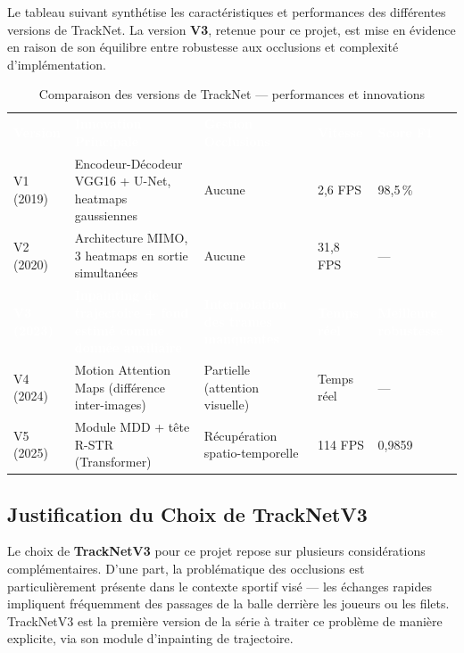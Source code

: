 \begin{itemize}
Le tableau suivant synthétise les caractéristiques et performances des différentes
versions de TrackNet. La version \textbf{V3}, retenue pour ce projet, est mise en
évidence en raison de son équilibre entre robustesse aux occlusions et complexité
d'implémentation.

\begin{table}[H]
  \centering
  \renewcommand{\arraystretch}{1.3}
  \begin{tabularx}{\textwidth}{C{2cm} X C{3cm} C{2cm} C{2cm}}
    \textcolor{white}{\textbf{Version}} &
    \textcolor{white}{\textbf{Innovation Principale}} &
    \textcolor{white}{\textbf{Gestion Occlusions}} &
    \textcolor{white}{\textbf{Vitesse}} &
    \textcolor{white}{\textbf{Score F1}} \\
    V1 (2019) &
    Encodeur-Décodeur VGG16 + U-Net, heatmaps gaussiennes &
    Aucune &
    2,6 FPS &
    98,5\,\% \\
    V2 (2020) &
    Architecture MIMO, 3 heatmaps en sortie simultanées &
    Aucune &
    31,8 FPS &
    — \\
    \textcolor{white}{\textbf{V3 (2023)}} &
    \textcolor{white}{\textbf{Inpainting de trajectoire + fond estimé comme donnée auxiliaire}} &
    \textcolor{white}{\textbf{Interpolation des trames manquantes}} &
    \textcolor{white}{\textbf{Temps réel}} &
    \textcolor{white}{\textbf{Meilleure robustesse}} \\
    V4 (2024) &
    Motion Attention Maps (différence inter-images) &
    Partielle (attention visuelle) &
    Temps réel &
    — \\
    V5 (2025) &
    Module MDD + tête R-STR (Transformer) &
    Récupération spatio-temporelle &
    114 FPS &
    0,9859 \\
  \end{tabularx}
  \caption{Comparaison des versions de TrackNet — performances et innovations}
  \label{tab:tracknet_versions}
\end{table}

\subsection{Justification du Choix de TrackNetV3}

Le choix de \textbf{TrackNetV3} pour ce projet repose sur plusieurs considérations
complémentaires. D'une part, la problématique des occlusions est particulièrement
présente dans le contexte sportif visé — les échanges rapides impliquent
fréquemment des passages de la balle derrière les joueurs ou les filets. TrackNetV3
est la première version de la série à traiter ce problème de manière explicite, via
son module d'inpainting de trajectoire.


\end{itemize}
